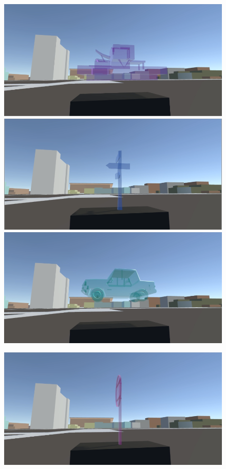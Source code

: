 \begin{appendices}
\begin{figure}
	\includegraphics[width=0.9\linewidth]{figures/tracing_shapes/finalstudy_shapes7}
	\par \smallskip
	\includegraphics[width=0.9\linewidth]{figures/tracing_shapes/finalstudy_shapes8}
	\par \smallskip
	\includegraphics[width=0.9\linewidth]{figures/tracing_shapes/finalstudy_shapes9}
	\par \smallskip
\end{figure}
\begin{figure}
	\centering
	\includegraphics[width=0.9\linewidth]{figures/tracing_shapes/finalstudy_shapes10}

\end{figure}
\end{appendices}
